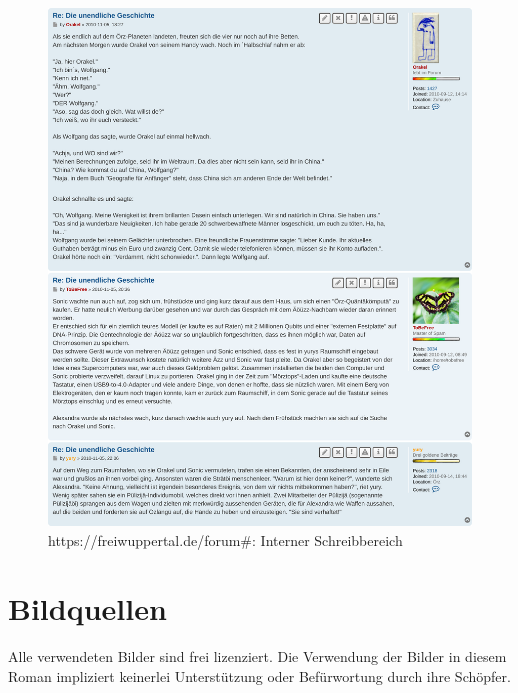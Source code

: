 \begin{figure}[p]
    \includegraphics[width=\linewidth]{z-include-main-forum.png}
    \caption{https://freiwuppertal.de/forum\#: Interner Schreibbereich}
\end{figure}


\chapter{Bildquellen}

Alle verwendeten Bilder sind frei lizenziert. Die Verwendung der Bilder in diesem Roman impliziert keinerlei Unterstützung oder Befürwortung durch ihre Schöpfer.


